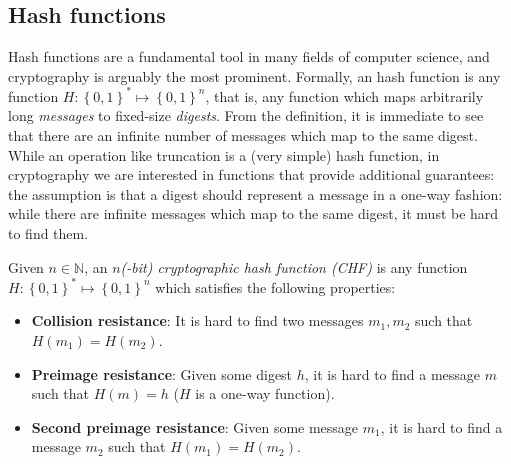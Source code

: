 \subsection{Hash functions}
Hash functions are a fundamental tool in many fields of computer science, and cryptography is
arguably the most prominent.
Formally, an hash function is any function \(H\colon {\left\{0, 1\right\}}^{*} \mapsto
{\left\{0, 1\right\}}^n\), that is, any function which maps arbitrarily long \emph{messages} to
fixed-size \emph{digests}.
From the definition, it is immediate to see that there are an infinite number of messages which map
to the same digest.
While an operation like truncation is a (very simple) hash function, in cryptography we are
interested in functions that provide additional guarantees: the assumption is that a digest should
represent a message in a one-way fashion: while there are infinite messages which map to the same
digest, it must be hard to find them.
\begin{definition}
	Given \(n \in \mathbb{N}\), an \emph{\(n\)(-bit) cryptographic hash function (CHF)} is any
	function \(H\colon {\left\{0, 1\right\}}^{*} \mapsto {\left\{0, 1\right\}}^n\) which satisfies
	the following properties:
	\begin{itemize}
		\item \textbf{Collision resistance}: It is hard to find two messages \(m_1, m_2\) such
		      that \(H\left(m_1\right) = H\left(m_2\right)\).
		\item \textbf{Preimage resistance}: Given some digest \(h\), it is hard to find a
		      message \(m\) such that \(H\left(m\right) = h\) (\(H\) is a one-way function).
		\item \textbf{Second preimage resistance}: Given some message \(m_1\), it is hard to
		      find a message \(m_2\) such that \(H\left(m_1\right) = H\left(m_2\right)\).
	\end{itemize}
\end{definition}

